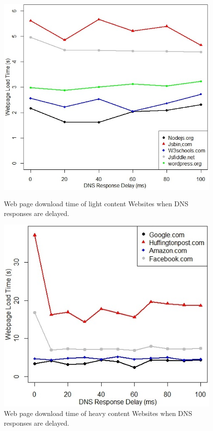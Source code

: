 \documentclass{llncs}
\begin{document}
\begin{figure}
  \includegraphics[width=\linewidth]{figures/dns_response_delay}
  \caption{Web page download time of light content Websites when DNS responses are delayed.}
  \label{fig:dns_response_delay}
\endminipage\hfill
{}%
  \includegraphics[width=\linewidth]{figures/dns_response_delay_new}
  \caption{Web page download time of heavy content Websites when DNS responses are delayed.}
  \label{fig:dns_response_delay_new}
\endminipage
\end{figure}
\end{document}
